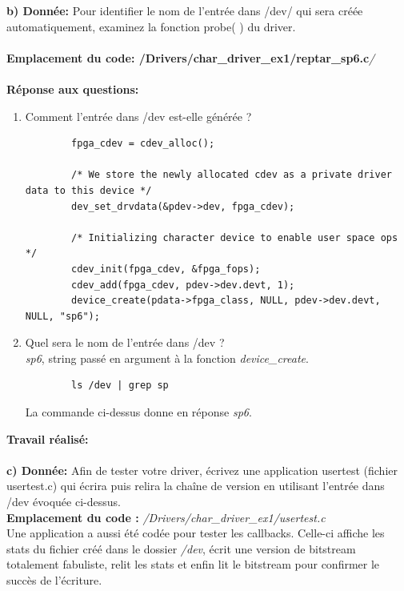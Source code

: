 \textbf{b) Donnée: }Pour identifier le nom de l'entrée dans /dev/ qui sera créée automatiquement, examinez la fonction
probe( ) du driver.\\\\
\textbf{Emplacement du code: /Drivers/char\_driver\_ex1/reptar\_sp6.c}\textit{/}\\\\
\textbf{Réponse aux questions: }
\begin{enumerate}
	\item Comment l'entrée dans /dev est-elle générée ? 
	\begin{lstlisting}
		fpga_cdev = cdev_alloc();
		
		/* We store the newly allocated cdev as a private driver data to this device */
		dev_set_drvdata(&pdev->dev, fpga_cdev);
		
		/* Initializing character device to enable user space ops */
		cdev_init(fpga_cdev, &fpga_fops);
		cdev_add(fpga_cdev, pdev->dev.devt, 1);
		device_create(pdata->fpga_class, NULL, pdev->dev.devt, NULL, "sp6");
	\end{lstlisting}
	\item  Quel sera le nom de l'entrée dans /dev ? \\
	\textit{sp6}, string passé en argument à la fonction \textit{device\_create}.
	\begin{lstlisting}
		ls /dev | grep sp 
	\end{lstlisting}
	La commande ci-dessus donne en réponse \textit{sp6}.
\end{enumerate}
\textbf{Travail réalisé: }\\\\
\textbf{c) Donnée: }Afin de tester votre driver, écrivez une application usertest (fichier usertest.c) qui écrira puis relira
la chaîne de version en utilisant l’entrée dans /dev évoquée ci-dessus.\\

\textbf{Emplacement du code : }\textit{/Drivers/char\_driver\_ex1/usertest.c}\\
Une application a aussi été codée pour tester les callbacks. Celle-ci affiche les stats du fichier créé dans le dossier \textit{/dev}, écrit une version de bitstream totalement fabuliste, relit les stats et enfin lit le bitstream pour confirmer le succès de l'écriture.\\

